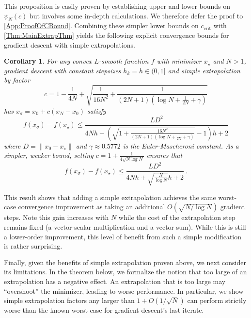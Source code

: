 \documentclass[11pt]{article}
\numberwithin{equation}{section}
\newtheorem{corollary}[thm]{Corollary}
\theoremstyle{definition}
\theoremstyle{definition}
\theoremstyle{definition}
\newcommand{\1}{\mathbf{1}}
\newcommand{\xStar}{x_\star}
\newcommand{\xSpecial}{x_\sigma}
\newcommand{\cCrit}{c_\mathrm{crit}}
\newcommand{\harmonicUpperBd}{\log N + \frac{1}{2N} + \gamma}
\begin{document}
This proposition is easily proven by establishing upper and lower bounds on $\psi_N(c)$ but involves some in-depth calculations. We therefore defer the proof to \cref{App:ProofOfCBound}.
Combining these simpler lower bounds on $\cCrit$ with \cref{Thm:MainExtrapThm} yields the following explicit convergence bounds for gradient descent with simple extrapolations.
\begin{corollary}\label{Cor:ExtrapSpecific}
     For any convex $L$-smooth function $f$ with minimizer $\xStar$ and $N > 1$, gradient descent with constant stepsizes $h_k=h\in(0,1]$ and simple extrapolation by factor
    \begin{equation}\label{Eqn:cLowerBd}
        c = 1 -\frac{1}{4N} + \sqrt{\frac{1}{16N^2}+\frac{1}{(2N+1)(\harmonicUpperBd)}}
    \end{equation}
    has $\xSpecial = x_0 + c(x_N-x_0)$ satisfy
    \begin{equation}\label{Eqn:ExtrapConvergenceSpec}
        f(\xSpecial) - f(\xStar) \leq \frac{LD^2}{4Nh+\left(\sqrt{1+\frac{16N^2}{(2N+1)(\harmonicUpperBd)}}-1\right)h  + 2 }
    \end{equation}
    where $D=\|x_0-\xStar\|$ and $\gamma\approx 0.5772$ is the Euler-Mascheroni constant. As a simpler, weaker bound, setting $c = 1 + \frac{1}{4 \sqrt{ N \log N}}$ ensures that
    \begin{equation}\label{Eqn:ExtrapConvergenceSimple}
        f(\xSpecial) - f(\xStar) \leq \frac{LD^2}{4Nh + \sqrt{\frac{N}{\log N}}h + 2} \ .  
    \end{equation}
\end{corollary}

This result shows that adding a simple extrapolation achieves the same worst-case convergence improvement as taking an additional $O(\sqrt{N/\log N})$ gradient steps. Note this gain increases with $N$ while the cost of the extrapolation step remains fixed (a vector-scalar multiplication and a vector sum). While this is still a lower-order improvement, this level of benefit from such a simple modification is rather surprising.

Finally, given the benefits of simple extrapolation proven above, we next consider its limitations. In the theorem below, we formalize the notion that too large of an extrapolation has a negative effect. An extrapolation that is too large may ``overshoot'' the minimizer, leading to worse performance. In particular, we show simple extrapolation factors any larger than $1+O(1/\sqrt{N})$ can perform strictly worse than the known worst case for gradient descent's last iterate.
\end{document}
